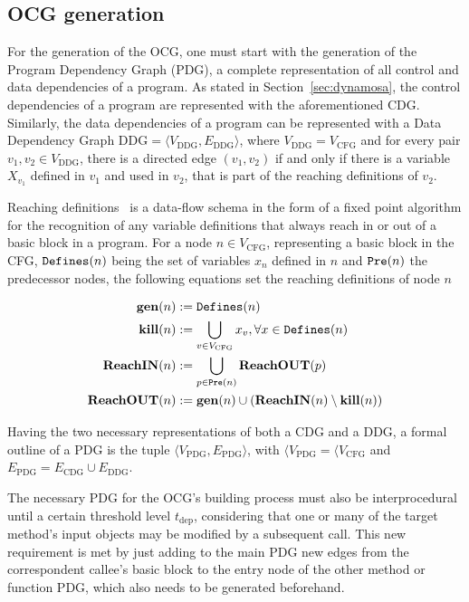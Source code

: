 \documentclass[%
  chapterprefix=false,%
  open=right,%
  twoside=true,%
  paper=a4,%
  logofile={Figures/logo.png},%
  thesistype=master,%
  UKenglish,%
]{se2thesis}
\newcommand{\callable}[2][]{\(\text{\texttt{#2}}(#1)\)}
\begin{document}
\subsection{OCG generation}\label{subsec:ocg_gen}

For the generation of the OCG, one must start with the generation of the Program Dependency Graph (PDG), a complete representation of all control and data dependencies of a program.
As stated in Section~\ref{sec:dynamosa}, the control dependencies of a program are represented with the aforementioned CDG.\@
Similarly, the data dependencies of a program can be represented with a Data Dependency Graph \(\text{DDG} = \langle V_{\text{DDG}}, E_{\text{DDG}} \rangle\), where \(V_{\text{DDG}} = V_{\text{CFG}}\) and for every pair \(v_1, v_2 \in V_{\text{DDG}}\), there is a directed edge \((v_1, v_2)\) if and only if there is a variable \(X_{v_1}\) defined in \(v_1\) and used in \(v_2\), that is part of the reaching definitions of \(v_2\).

Reaching definitions~\cite{DBLP:books/aw/AhoSU86} is a data-flow schema in the form of a fixed point algorithm for the recognition of any variable definitions that always reach in or out of a basic block in a program.
For a node \(n \in V_{\text{CFG}}\), representing a basic block in the CFG, \callable[n]{Defines} being the set of variables \(x_n\) defined in \(n\) and \callable[n]{Pre} the predecessor nodes, the following equations set the reaching definitions of node \(n\)

\begin{align*}
  \text{\textbf{gen}}(n) &:= \text{\callable[n]{Defines}} \\
  \text{\textbf{kill}}(n) &:= \bigcup_{v \in V_{\text{CFG}}} x_v, \forall x \in \text{\callable[n]{Defines}} \\
  \text{\textbf{ReachIN}}(n) &:= \bigcup_{p \in \text{\callable[n]{Pre}}} \text{\textbf{ReachOUT}}(p) \\
  \text{\textbf{ReachOUT}}(n) &:= \text{\textbf{gen}}(n) \cup (\text{\textbf{ReachIN}}(n) \setminus \text{\textbf{kill}}(n))\\
\end{align*}

Having the two necessary representations of both a CDG and a DDG, a formal outline of a PDG is the tuple \(\langle V_{\text{PDG}}, E_{\text{PDG}} \rangle\), with \(\langle V_{\text{PDG}} = \langle V_{\text{CFG}}\) and \(E_{\text{PDG}} = E_{\text{CDG}} \cup E_{\text{DDG}}\).

The necessary PDG for the OCG's building process must also be interprocedural until a certain threshold level \(t_{\text{dep}}\), considering that one or many of the target method's input objects may be modified by a subsequent call.
This new requirement is met by just adding to the main PDG new edges from the correspondent callee's basic block to the entry node of the other method or function PDG, which also needs to be generated beforehand.
\end{document}

